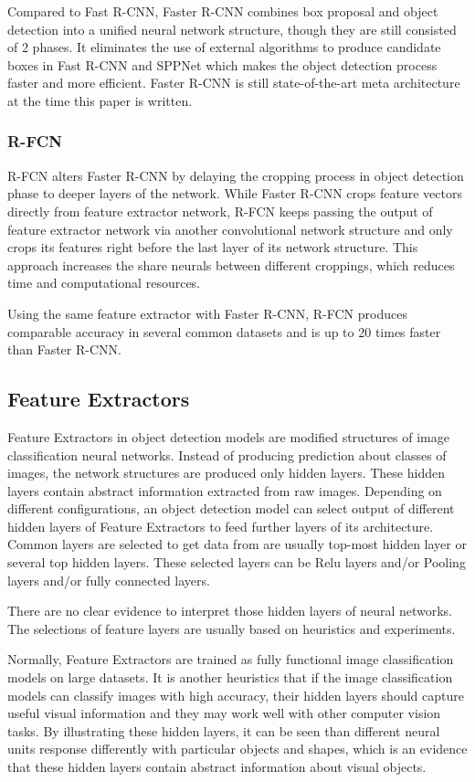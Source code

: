 \documentclass[conference]{IEEEtran}
\begin{document}
Compared to Fast R-CNN, Faster R-CNN combines box proposal and object detection into a unified neural network structure, though they are still consisted of 2 phases. It eliminates the use of external algorithms to produce candidate boxes in Fast R-CNN and SPPNet which makes the object detection process faster and more efficient. Faster R-CNN is still state-of-the-art meta architecture at the time this paper is written.

\subsubsection{R-FCN}
R-FCN alters Faster R-CNN by delaying the cropping process in object detection phase to deeper layers of the network. While Faster R-CNN crops feature vectors directly from feature extractor network, R-FCN keeps passing the output of feature extractor network via another convolutional network structure and only crops its features right before the last layer of its network structure. This approach increases the share neurals between different croppings, which reduces time and computational resources.

Using the same feature extractor with Faster R-CNN, R-FCN produces comparable accuracy in several common datasets and is up to 20 times faster than Faster R-CNN.

\subsection{Feature Extractors}
Feature Extractors in object detection models are modified structures of image classification neural networks. Instead of producing prediction about classes of images, the network structures are produced only hidden layers. These hidden layers contain abstract information extracted from raw images. Depending on different configurations, an object detection model can select output of different hidden layers of Feature Extractors to feed further layers of its architecture. Common layers are selected to get data from are usually top-most hidden layer or several top hidden layers. These selected layers can be Relu layers and/or Pooling layers and/or fully connected layers. 

There are no clear evidence to interpret those hidden layers of neural networks. The selections of feature layers are usually based on heuristics and experiments. 

Normally, Feature Extractors are trained as fully functional image classification models on large datasets. It is another heuristics that if the image classification models can classify images with high accuracy, their hidden layers should capture useful visual information and they may work well with other computer vision tasks. By illustrating these hidden layers, it can be seen than different neural units response differently with particular objects and shapes, which is an evidence that these hidden layers contain abstract information about visual objects.
\end{document}

